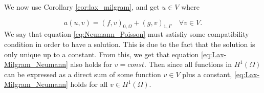 We now use Corollary \ref{cor:lax_milgram}, and get $u\in V$ where

\begin{equation}\label{eq:Lax-Milgram_Neumann}
  a(u,v) = (f,v)_{0,\Omega} + (g,v)_{1,\Gamma} \quad \forall v\in V.  
\end{equation}
We say that equation \ref{eq:Neumann_Poisson} must satisfiy some compatibility condition in order to have a solution. This is due to the fact that the solution is only unique up to a constant. From this, we get that equation \ref{eq:Lax-Milgram_Neumann} also holds for $v=const$.
Then since all functions in $H^1(\Omega)$ can be expressed as a direct sum of some function $v\in V$ plus a constant, \ref{eq:Lax-Milgram_Neumann} holds for all $v\in H^1(\Omega)$.